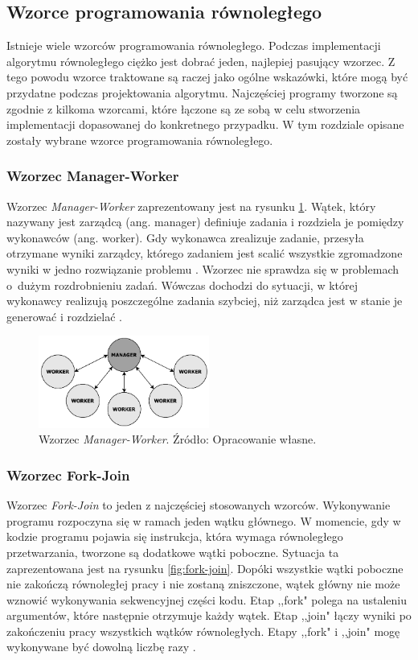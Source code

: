 \documentclass[12pt]{article}
\begin{document}
\subsection{Wzorce programowania równoległego}
Istnieje wiele wzorców programowania równoległego. Podczas implementacji algorytmu równoległego ciężko jest dobrać jeden, najlepiej pasujący wzorzec.
Z tego powodu wzorce traktowane są raczej jako ogólne wskazówki, które mogą być przydatne podczas projektowania algorytmu. Najczęściej programy
tworzone są zgodnie z kilkoma wzorcami, które łączone są ze sobą w celu stworzenia implementacji dopasowanej do konkretnego przypadku.
W tym rozdziale opisane zostały wybrane wzorce programowania równoległego.

\subsubsection{Wzorzec Manager-Worker}
Wzorzec \textit{Manager-Worker} zaprezentowany jest na rysunku \ref{fig:manager-worker}. Wątek, który nazywany jest zarządcą (ang. manager)
definiuje zadania i rozdziela je pomiędzy wykonawców (ang. worker). Gdy wykonawca zrealizuje zadanie, przesyła
otrzymane wyniki zarządcy, którego zadaniem jest scalić wszystkie zgromadzone wyniki w jedno rozwiązanie problemu \cite{introduction-to-parallel-computing}.
Wzorzec nie sprawdza się w problemach o~dużym rozdrobnieniu zadań. Wówczas dochodzi do sytuacji, w której wykonawcy realizują poszczególne zadania
szybciej, niż zarządca jest w stanie je generować i rozdzielać \cite{wprowadzenie-do-obliczen-rownoleglych}.

\begin{figure}[H]
    \centering
	\includegraphics[width=0.5\textwidth]{patterns-master-slave.pdf}
    \caption{Wzorzec \textit{Manager-Worker}. Źródło: Opracowanie własne.}
    \label{fig:manager-worker}
\end{figure}

\subsubsection{Wzorzec Fork-Join}
Wzorzec \textit{Fork-Join} to jeden z najczęściej stosowanych wzorców. Wykonywanie programu rozpoczyna się
w ramach jeden wątku głównego. W momencie, gdy w kodzie programu pojawia się instrukcja, która wymaga
równoległego przetwarzania, tworzone są dodatkowe wątki poboczne. Sytuacja ta zaprezentowana jest na rysunku \ref{fig:fork-join}. Dopóki wszystkie
wątki poboczne nie zakończą równoległej pracy i nie zostaną zniszczone, wątek główny nie może wznowić wykonywania
sekwencyjnej części kodu. Etap ,,fork" polega na ustaleniu argumentów, które następnie otrzymuje każdy wątek.
Etap ,,join" łączy wyniki po zakończeniu pracy wszystkich wątków równoległych. Etapy ,,fork" i ,,join"
mogę wykonywane być dowolną liczbę razy \cite{parallel-design-patterns}.
\end{document}
